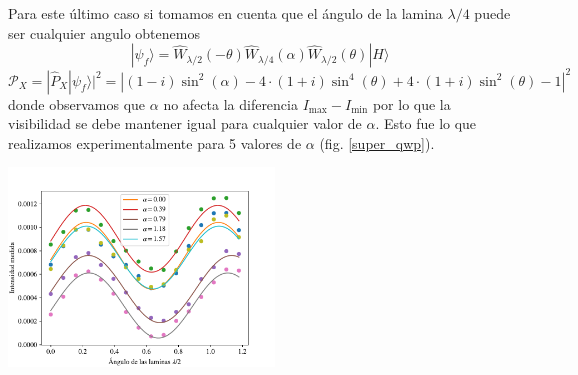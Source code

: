 \documentclass[onecolumn]{article}
\begin{document}
		Para este último caso si tomamos en cuenta que el ángulo de la lamina $\lambda/4$ puede ser cualquier angulo obtenemos
		$$
		| \psi_f\rangle=\hat{W}_{\lambda / 2}(-\theta)\hat{W}_{\lambda / 4}(\alpha)\hat{W}_{\lambda / 2}(\theta)|H\rangle
		$$
		$$
		\mathcal{P}_X=|\hat{P}_X | \psi_f\rangle|^ 2=\left|(1-i) \sin ^2(\alpha)-4 \cdot(1+i) \sin ^4(\theta)+4 \cdot(1+i) \sin ^2(\theta)-1\right|^2
		$$
		donde observamos que $\alpha$ no afecta la diferencia $I_{\max }-I_{\min }$ por lo que la visibilidad se debe mantener igual para cualquier valor de $\alpha$. Esto fue lo que realizamos experimentalmente para 5 valores de $\alpha$ (fig. \ref{super_qwp}).
		\begin{center}
			\includegraphics[width=200pt]{img/inter/super_qwp.pdf}
			\label{super_qwp}
		\end{center}
\end{document}
